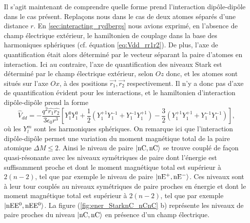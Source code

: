 Il s'agit maintenant de comprendre quelle forme prend l'interaction dipôle-dipôle dans le cas présent.
Replaçons nous dans le cas de deux atomes séparés d'une distance $r$.
En \ref{sec:interacting_rydbergs} nous avions exprimé, en l'absence de champ électrique extérieur, le hamiltonien de couplage dans la base des harmoniques sphériques (cf. équation \eqref{eq:Vdd_rr1r2}).
De plus, l'axe de quantification était alors déterminé par le vecteur séparant la paire d'atomes en interaction.
Ici au contraire, l'axe de quantification des niveaux Stark est déterminé par le champ électrique extérieur, selon $Oz$ donc, et les atomes sont situés sur l'axe $Ox$, à des positions $\vec{r_1},\vec{r_2}$ respectivement.
Il n'y a donc pas d'axe de quantification évident pour les interactions, et le hamiltonien d'interaction dipôle-dipôle prend la forme
\begin{equation}
\label{eq:dipdip_nC}
\hat{V}_{dd} = -\frac{q^2\hat{r_1} \hat{r_2}}{3\epsilon_0 r^3}
\left[ Y_1^0 Y_1^0 + \frac{1}{2} \left( Y_1^{+1}Y_1^{-1} + Y_1^{-1}Y_1^{+1} \right)
- \frac{3}{2} \left(  Y_1^{+1}Y_1^{+1} + Y_1^{-1}Y_1^{-1} \right) \right],
\end{equation}
où les $Y_l^m$ sont les harmoniques sphériques.
On remarque ici que l'interaction dipôle-dipôle permet une variation du moment magnétique total de la paire atomique $\Delta M \leq 2$.
Ainsi le niveau de paire $\ket{\mathrm{nC},\mathrm{nC}}$ se trouve couplé de façon quasi-résonante avec les niveaux symétriques de paire dont l'énergie est suffisamment proche et dont le moment magnétique total est supérieur  à $2(n-2)$, tel que par exemple le niveau de paire %
$\ket{\mathrm{nE^+,nE^-}}$.
Ces niveaux sont à leur tour couplés au niveaux symétriques de paire proches en énergie et dont le moment magnétique total est supérieur à $2(n-2)$, tel que par exemple $\ket{\mathrm{nEE^0},\mathrm{nEE^0}}$.
La figure (\ref{fig:ener_StarknC_nCnC} b) représente les niveaux de paire proches du niveau $\ket{\mathrm{nC},\mathrm{nC}}$ en présence d'un champ électrique.


